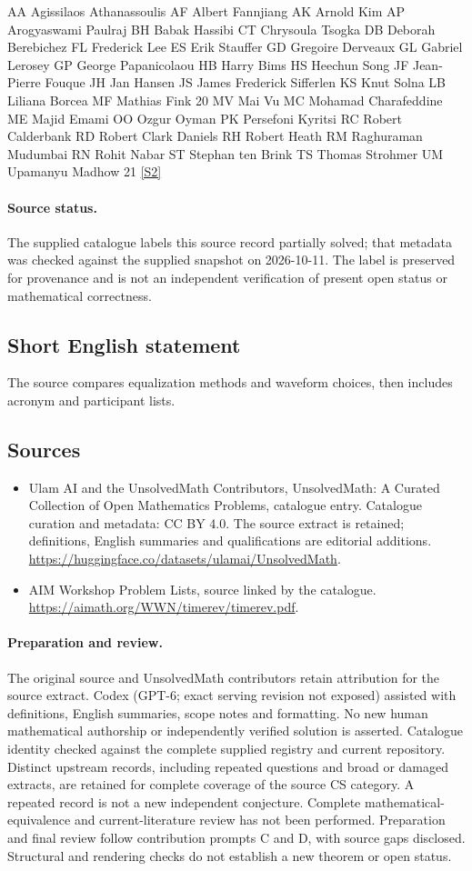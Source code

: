 \documentclass[11pt]{article}
\begin{document}
AA Agissilaos Athanassoulis AF Albert Fannjiang AK Arnold Kim AP Arogyaswami Paulraj BH Babak Hassibi CT Chrysoula Tsogka DB Deborah Berebichez FL Frederick Lee ES Erik Stauffer GD Gregoire Derveaux GL Gabriel Lerosey GP George Papanicolaou HB Harry Bims HS Heechun Song JF Jean-Pierre Fouque JH Jan Hansen JS James Frederick Sifferlen KS Knut Solna LB Liliana Borcea MF Mathias Fink 20 MV Mai Vu MC Mohamad Charafeddine ME Majid Emami OO Ozgur Oyman PK Persefoni Kyritsi RC Robert Calderbank RD Robert Clark Daniels RH Robert Heath RM Raghuraman Mudumbai RN Rohit Nabar ST Stephan ten Brink TS Thomas Strohmer UM Upamanyu Madhow 21 \href{https://aimath.org/WWN/timerev/timerev.pdf}{[S2]}
\paragraph{Source status.}
The supplied catalogue labels this source record partially solved; that metadata was checked against the supplied snapshot on 2026-10-11. The label is preserved for provenance and is not an independent verification of present open status or mathematical correctness.
\subsection{Short English statement}
The source compares equalization methods and waveform choices, then includes acronym and participant lists.
\subsection{Sources}
\begin{itemize}
\item[S1] Ulam AI and the UnsolvedMath Contributors, UnsolvedMath: A Curated Collection of Open Mathematics Problems, catalogue entry. Catalogue curation and metadata: CC BY 4.0. The source extract is retained; definitions, English summaries and qualifications are editorial additions.
\url{https://huggingface.co/datasets/ulamai/UnsolvedMath}.
\item[S2] AIM Workshop Problem Lists, source linked by the catalogue.
\url{https://aimath.org/WWN/timerev/timerev.pdf}.
\end{itemize}
\paragraph{Preparation and review.}
The original source and UnsolvedMath contributors retain attribution for the source extract. Codex (GPT-6; exact serving revision not exposed) assisted with definitions, English summaries, scope notes and formatting. No new human mathematical authorship or independently verified solution is asserted. Catalogue identity checked against the complete supplied registry and current repository. Distinct upstream records, including repeated questions and broad or damaged extracts, are retained for complete coverage of the source CS category. A repeated record is not a new independent conjecture. Complete mathematical-equivalence and current-literature review has not been performed. Preparation and final review follow contribution prompts C and D, with source gaps disclosed. Structural and rendering checks do not establish a new theorem or open status.
\label{end:statement}
\end{document}
